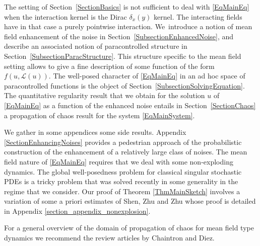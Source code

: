 \documentclass[JEP,XML,SOM,Unicode,published]{cedram}
\theoremstyle{definition}
\newcommand{\mcL}{\mathcal{L}}
\begin{document}
The setting of Section~\ref{SectionBasics} is not sufficient to deal with \eqref{EqMainEq} when the interaction kernel is the Dirac $\delta_x(y)$ kernel. The interacting fields have in that case a purely pointwise interaction. We~introduce a notion of mean field enhancement of the noise in Section~\ref{SubsectionEnhancedNoise}, and describe an associated notion of paracontrolled structure in Section~\ref{SubsectionParacStructure}. This structure specific to the mean field setting allows to give a fine description of some function of the form $f(u,\mcL(u))$. The well-posed character of \eqref{EqMainEq} in an ad hoc space of paracontrolled functions is the object of Section~\ref{SubsectionSolvingEquation}. The quantitative regularity result that we obtain for the solution $u$ of \eqref{EqMainEq} as a function of the enhanced noise entails in Section~\ref{SectionChaos} a propagation of chaos result for the system \eqref{EqMainSystem}.

We gather in some appendices some side results. Appendix \ref{SectionEnhancingNoises} provides a pedestrian approach of the probabilistic construction of the enhancement of a relatively large class of noises. The mean field nature of \eqref{EqMainEq} requires that we deal with some non-exploding dynamics. The global well-posedness problem for classical singular stochastic PDEs is a tricky problem that was solved recently in some generality in the regime that we consider. Our proof of Theorem \ref{ThmMainSketch} involves a variation of some a priori estimates of Shen, Zhu and Zhu \cite{ShenZhuZhu} whose proof is detailed in Appendix \ref{section_appendix_nonexplosion}.

For a general overview of the domain of propagation of chaos for mean field type dynamics we recommend the review articles \cite{ChaintronDiez1, ChaintronDiez2} by Chaintron and Diez.
\end{document}
